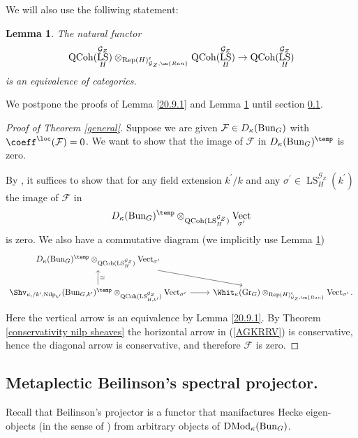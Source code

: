 \documentclass[9pt]{amsart}
\DeclareMathOperator{\Gra}{{Gr}}
\newcommand{\cF}{{\mathcal F}}
\newcommand{\cG}{{\mathcal G}}
\newcommand{\Ranp}{{\on{Ran}}}
\DeclareMathOperator{\QCoh}{{QCoh}}
\DeclareMathOperator{\LocSys}{{LS}}
\DeclareMathOperator{\Nilp}{{Nilp}} \DeclareMathOperator{\op}{{op}}
\DeclareMathOperator{\Vect}{{Vect}}
\DeclareMathOperator{\Rep}{{Rep}}
\newtheorem{lm}[subsubsection]{Lemma}
\numberwithin{equation}{section}
\DeclareMathOperator{\D}{{DMod}}
\begin{document}
We will also use the folliwing statement:
\begin{lm}\label{Rep(H) and LS}
	The natural functor
	$$\QCoh(\LocSys_H^{\cG_Z}) \otimes_{\Rep(H)_{\cG_Z, \Ranp}^{\epsilon}} \QCoh(\LocSys_H^{\cG_Z}) \rightarrow \QCoh(\LocSys_H^{\cG_Z})$$
	is an equivalence of categories.
\end{lm}

We postpone the proofs of Lemma \ref{20.9.1} and Lemma \ref{Rep(H) and LS} until section \ref{spectral proj section}.

\begin{proof}[Proof of Theorem \ref{general}]
	Suppose we are given $\cF \in D_{\kappa}(\Bun_{G})$ with $\coeff^{\loc}(\cF) = 0$. We want to show that the image of $\cF$ in $D_{\kappa}(\Bun_{G})^{\temp}$ is zero. 
	
	By \cite[Lemma 21.4.6]{AGKRRV}, it suffices to show that for any field extension $k^{\prime} / k$ and any $\sigma^{\prime} \in \LocSys_H^{\cG_Z}(k^{\prime})$ the image of $\cF$ in $$D_{\kappa}(\Bun_{G})^{\temp} \otimes_{\QCoh(\LocSys_H^{\cG_Z})} \Vect_{\sigma^{\prime}}$$ is zero. 
	We also have a commutative diagram (we implicitly use Lemma \ref{Rep(H) and LS})
	\begin{equation}\label{AGKRRV}
	\begin{tikzcd}
D_{\kappa}(\Bun_{G})^{\temp} \otimes_{\QCoh(\LocSys_H^{\cG_Z})}\Vect_{\sigma^{\prime}}\ar[dr, rightarrow, ""]&   	  \\
	 \Shv_{\kappa, /k^{\prime}, \Nilp_{k^{\prime}}}(\Bun_{G, k^{\prime}})^{\temp} \otimes_{\QCoh(\LocSys_{H, k^{\prime}}^{\cG_Z})}\Vect_{\sigma^{\prime}}\ar[u, rightarrow, "\simeq"']\ar[r, rightarrow, ""']&   \Whit_{\kappa}(\Gra_G) \otimes_{\Rep(H)_{\cG_Z, \Ranp}^{\epsilon}} \Vect_{\sigma^{\prime}}.
	\end{tikzcd}
	\end{equation}
	Here the vertical arrow is an equivalence by Lemma \ref{20.9.1}. By Theorem \ref{conservativity nilp sheaves} the horizontal arrow in (\ref{AGKRRV}) is conservative, hence the diagonal arrow is conservative, and therefore $\cF$ is zero.
\end{proof}

\subsection{Metaplectic Beilinson's spectral projector.}\label{spectral proj section}
Recall that Beilinson’s projector is a functor that manifactures Hecke
eigen-objects (in the sense of \cite[9.5.3]{GL}) from arbitrary objects of $\D_{\kappa}(\Bun_G)$. 
\end{document}
